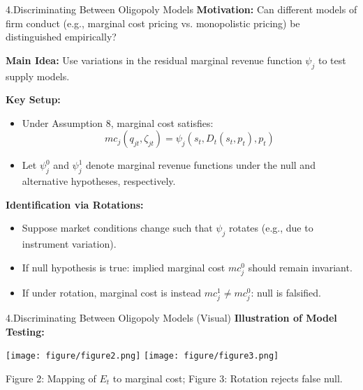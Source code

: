 \documentclass[aspectratio=169]{beamer}  %
\begin{document}
\begin{frame}{4.Discriminating Between Oligopoly Models}
\textbf{Motivation:} Can different models of firm conduct (e.g., marginal cost pricing vs. monopolistic pricing) be distinguished empirically?

\textbf{Main Idea:} Use variations in the residual marginal revenue function $\psi_j$ to test supply models.

\textbf{Key Setup:}
\begin{itemize}
  \item Under Assumption 8, marginal cost satisfies:
  \begin{equation*}
    mc_j(q_{jt}, \zeta_{jt}) = \psi_j(s_t, D_t(s_t, p_t), p_t)
  \end{equation*}
  \item Let $\psi_j^0$ and $\psi_j^1$ denote marginal revenue functions under the null and alternative hypotheses, respectively.
\end{itemize}

\textbf{Identification via Rotations:}
\begin{itemize}
  \item Suppose market conditions change such that $\psi_j$ rotates (e.g., due to instrument variation).
  \item If null hypothesis is true: implied marginal cost $mc_j^0$ should remain invariant.
  \item If under rotation, marginal cost is instead $mc_j^1 \neq mc_j^0$: null is falsified.
\end{itemize}
\end{frame}

\begin{frame}{4.Discriminating Between Oligopoly Models (Visual)}
\textbf{Illustration of Model Testing:}

\begin{center}
    \texttt{[image: figure/figure2.png]}
    \hfill
    \texttt{[image: figure/figure3.png]}

    \vspace{0.5em}
    {\small Figure 2: Mapping of $E_t$ to marginal cost; Figure 3: Rotation rejects false null.}
\end{center}
\end{frame}
\end{document}
